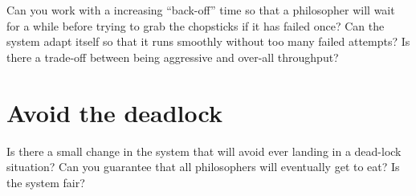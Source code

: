 \documentclass[a4paper,11pt]{article}
\begin{document}
Can you work with a increasing ``back-off'' time so that a philosopher
will wait for a while before trying to grab the chopsticks if it has
failed once? Can the system adapt itself so that it runs smoothly
without too many failed attempts? Is there a trade-off between being
aggressive and over-all throughput?



\section{Avoid the deadlock}

Is there a small change in the system that will avoid ever landing in
a dead-lock situation? Can you guarantee that all philosophers will
eventually get to eat? Is the system fair?
\end{document}
